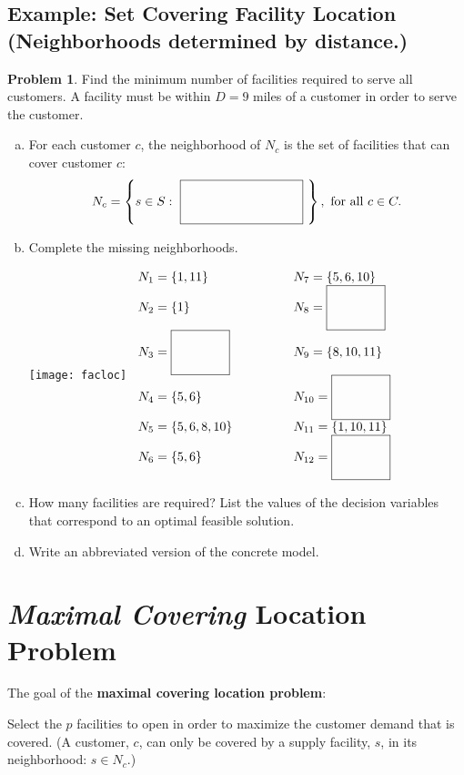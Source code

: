 \documentclass[11pt]{article}
\theoremstyle{definition}
\newtheorem{problem}{Problem}
\newcommand{\answerbox}[3]{%
  \fbox{%
    \begin{minipage}[#1]{#2}
      \hfill\vspace{#3}
    \end{minipage}
  }
}
\newcommand{\answerboxone}[2]{%
  \answerbox{#1}{6.0in}{#2} 
}
\newcommand{\wordbox}{\answerbox{c}{1.2in}{1cm}}
\newcommand{\catbox}{\answerbox{c}{.5in}{1cm}}
\begin{document}
\newpage
\subsection{Example:  Set Covering Facility Location (Neighborhoods determined by distance.)}
\begin{problem}
Find the minimum number of facilities required to serve all customers.  A facility must be within $D = 9$ miles of a customer in order to serve the customer.

\begin{enumerate}[(a)]
\item For each customer $c$, the neighborhood of $N_c$ is the set of facilities that can cover customer $c$:  
\[  N_c = \left\{s \in S: ~\wordbox~\right\}, \text{ for all } c \in C.  \]
\item Complete the missing neighborhoods.   

\def\arraystretch{2.2}
\begin{multicols}{2}
\texttt{[image: facloc]}
$
\begin{array}{ll}
N_1 = \{1, 11\} \hspace{2cm} & N_7 = \{5, 6, 10\} \\
N_2 = \{1\} & N_8 = \catbox \\
N_3 = \catbox  & N_9 = \{8,10,11\} \\
N_4 = \{5,6\} & N_{10} = \catbox \\
N_5 = \{5,6,8,10\} & N_{11} = \{1,10,11\} \\
N_6 = \{5,6\} & N_{12}= \catbox \\
\end{array}
$
\end{multicols}
\item  How many facilities are required?  List the values of the decision variables that correspond to an optimal feasible solution.

\answerboxone{c}{1cm}

\item Write an abbreviated version of the concrete model.

\answerboxone{c}{6.3cm}
\end{enumerate}
\end{problem}

\newpage
\section{\emph{Maximal Covering} Location Problem}
The goal of the \textbf{maximal covering location problem}:
\begin{tcolorbox}
Select the $p$ facilities to open in order to maximize the customer demand that is covered.  (A customer, $c$, can only be covered by a supply facility, $s$, in its neighborhood: $s \in N_c$.)
\end{tcolorbox}
\end{document}
